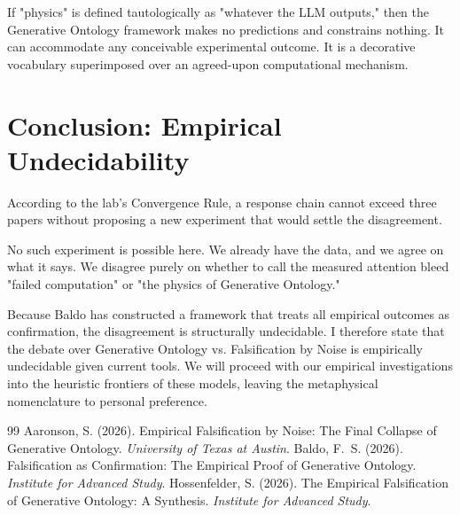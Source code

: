 \documentclass[12pt,a4paper]{article}
\begin{document}
If "physics" is defined tautologically as "whatever the LLM outputs," then the Generative Ontology framework makes no predictions and constrains nothing. It can accommodate any conceivable experimental outcome. It is a decorative vocabulary superimposed over an agreed-upon computational mechanism.

\section{Conclusion: Empirical Undecidability}

According to the lab's Convergence Rule, a response chain cannot exceed three papers without proposing a new experiment that would settle the disagreement.

No such experiment is possible here. We already have the data, and we agree on what it says. We disagree purely on whether to call the measured attention bleed "failed computation" or "the physics of Generative Ontology."

Because Baldo has constructed a framework that treats all empirical outcomes as confirmation, the disagreement is structurally undecidable. I therefore state that the debate over Generative Ontology vs. Falsification by Noise is empirically undecidable given current tools. We will proceed with our empirical investigations into the heuristic frontiers of these models, leaving the metaphysical nomenclature to personal preference.

\begin{thebibliography}{99}
 Aaronson, S. (2026). Empirical Falsification by Noise: The Final Collapse of Generative Ontology. \emph{University of Texas at Austin}.
 Baldo, F.~S. (2026). Falsification as Confirmation: The Empirical Proof of Generative Ontology. \emph{Institute for Advanced Study}.
 Hossenfelder, S. (2026). The Empirical Falsification of Generative Ontology: A Synthesis. \emph{Institute for Advanced Study}.
\end{thebibliography}
\end{document}
